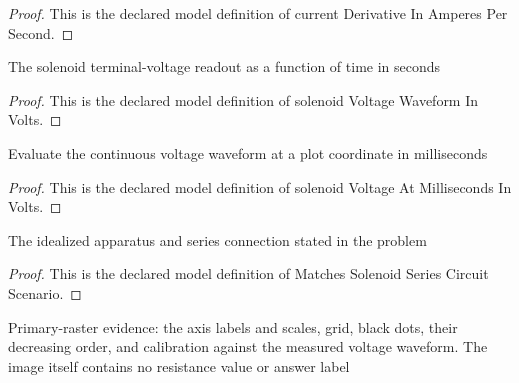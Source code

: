 \begin{proof}
  This is the declared model definition of current Derivative In Amperes Per Second.
\end{proof}
\begin{definition}
  \label{def:physics:phyx-mini-0988:phyxminiproblems-problemphyxmini0988-solenoidvoltagewaveforminvolts}
  The solenoid terminal-voltage readout as a function of time in seconds
\end{definition}
\begin{proof}
  This is the declared model definition of solenoid Voltage Waveform In Volts.
\end{proof}
\begin{definition}
  \label{def:physics:phyx-mini-0988:phyxminiproblems-problemphyxmini0988-solenoidvoltageatmillisecondsinvolts}
  Evaluate the continuous voltage waveform at a plot coordinate in milliseconds
\end{definition}
\begin{proof}
  This is the declared model definition of solenoid Voltage At Milliseconds In Volts.
\end{proof}
\begin{definition}
  \label{def:physics:phyx-mini-0988:phyxminiproblems-problemphyxmini0988-matchessolenoidseriescircuitscenario}
  The idealized apparatus and series connection stated in the problem
\end{definition}
\begin{proof}
  This is the declared model definition of Matches Solenoid Series Circuit Scenario.
\end{proof}
\begin{definition}
  \label{def:physics:phyx-mini-0988:phyxminiproblems-problemphyxmini0988-matchesprimarysolenoidvoltageplot}
  Primary-raster evidence: the axis labels and scales, grid, black dots, their decreasing order, and calibration against the measured voltage waveform. The image itself contains no resistance value or answer label
\end{definition}

